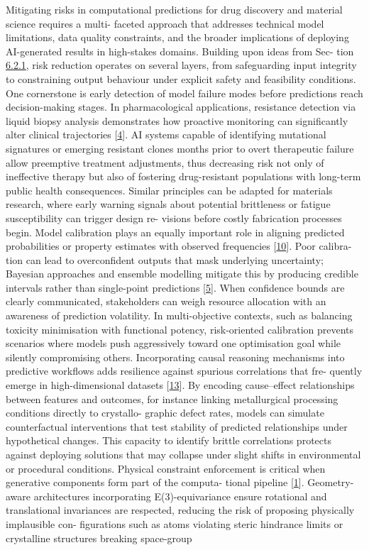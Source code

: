 \documentclass[
]{article}
\begin{document}
Mitigating risks in computational predictions for drug discovery and
material science requires a multi- faceted approach that addresses
technical model limitations, data quality constraints, and the broader
implications of deploying AI-generated results in high-stakes domains.
Building upon ideas from Sec- tion
\protect\hyperlink{transparency-and-interpretability-of-ai-models}{6.2.1},
risk reduction operates on several layers, from safeguarding input
integrity to constraining output behaviour under explicit safety and
feasibility conditions. One cornerstone is early detection of model
failure modes before predictions reach decision-making stages. In
pharmacological applications, resistance detection via liquid biopsy
analysis demonstrates how proactive monitoring can significantly alter
clinical trajectories {[}\protect\hyperlink{_bookmark44}{4}{]}. AI
systems capable of identifying mutational signatures or emerging
resistant clones months prior to overt therapeutic failure allow
preemptive treatment adjustments, thus decreasing risk not only of
ineffective therapy but also of fostering drug-resistant populations
with long-term public health consequences. Similar principles can be
adapted for materials research, where early warning signals about
potential brittleness or fatigue susceptibility can trigger design re-
visions before costly fabrication processes begin. Model calibration
plays an equally important role in aligning predicted probabilities or
property estimates with observed frequencies
{[}\protect\hyperlink{_bookmark50}{10}{]}. Poor calibra- tion can lead
to overconfident outputs that mask underlying uncertainty; Bayesian
approaches and ensemble modelling mitigate this by producing credible
intervals rather than single-point predictions
{[}\protect\hyperlink{_bookmark45}{5}{]}. When confidence bounds are
clearly communicated, stakeholders can weigh resource allocation with an
awareness of prediction volatility. In multi-objective contexts, such as
balancing toxicity minimisation with functional potency, risk-oriented
calibration prevents scenarios where models push aggressively toward one
optimisation goal while silently compromising others. Incorporating
causal reasoning mechanisms into predictive workflows adds resilience
against spurious correlations that fre- quently emerge in
high-dimensional datasets {[}\protect\hyperlink{_bookmark53}{13}{]}. By
encoding cause--effect relationships between features and outcomes, for
instance linking metallurgical processing conditions directly to
crystallo- graphic defect rates, models can simulate counterfactual
interventions that test stability of predicted relationships under
hypothetical changes. This capacity to identify brittle correlations
protects against deploying solutions that may collapse under slight
shifts in environmental or procedural conditions. Physical constraint
enforcement is critical when generative components form part of the
computa- tional pipeline {[}\protect\hyperlink{_bookmark41}{1}{]}.
Geometry-aware architectures incorporating E(3)-equivariance ensure
rotational and translational invariances are respected, reducing the
risk of proposing physically implausible con- figurations such as atoms
violating steric hindrance limits or crystalline structures breaking
space-group
\end{document}
